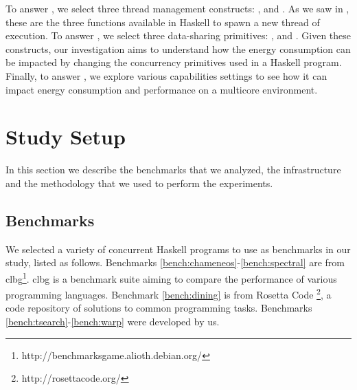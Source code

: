 To answer , we select three thread management constructs: \forkIO, \forkOn and \forkOS. As we saw in , these are the three functions available in Haskell to spawn a new thread of execution. To answer , we select three data-sharing primitives: \MVar, \TMVar and \TVar. Given these constructs, our investigation aims to understand how the energy consumption can be impacted by changing the concurrency primitives used in a Haskell program. Finally, to answer , we explore various capabilities settings to see how it can impact energy consumption and performance on a multicore environment.


\section{Study Setup}\label{sec:setup}
In this section we describe the benchmarks that we analyzed, the infrastructure and the methodology that we used to perform the experiments.

\subsection{Benchmarks}
We selected a variety of concurrent Haskell programs to use as benchmarks in our study, listed as follows. Benchmarks \ref{bench:chameneos}-\ref{bench:spectral} are from \ac{clbg}\footnote{http://benchmarksgame.alioth.debian.org/}. \acs{clbg} is a benchmark suite aiming to compare the performance of various programming languages. Benchmark \ref{bench:dining} is from  Rosetta Code \footnote{http://rosettacode.org/}, a code repository of solutions to common programming tasks. Benchmarks \ref{bench:tsearch}-\ref{bench:warp} were developed by us.

